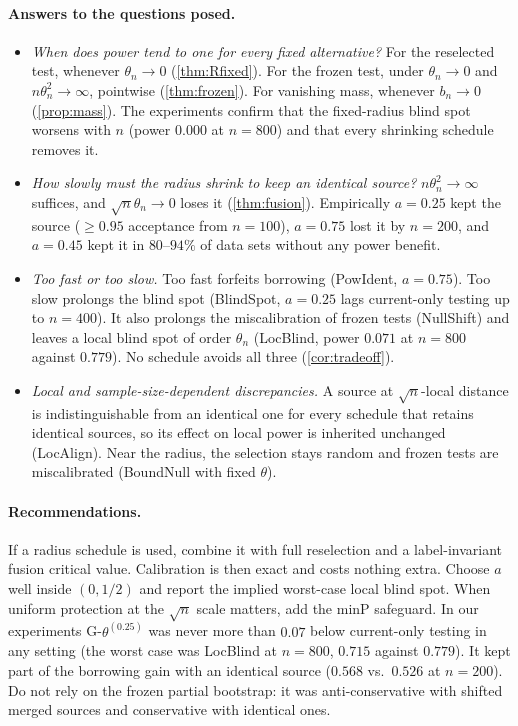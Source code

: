 \paragraph{Answers to the questions posed.}
\begin{itemize}[leftmargin=1.4em,itemsep=1pt]
\item \emph{When does power tend to one for every fixed alternative?} For the reselected test, whenever $\theta_n\to0$ (\cref{thm:Rfixed}). For the frozen test, under $\theta_n\to0$ and $n\theta_n^2\to\infty$, pointwise (\cref{thm:frozen}). For vanishing mass, whenever $b_n\to0$ (\cref{prop:mass}). The experiments confirm that the fixed-radius blind spot worsens with $n$ (power $0.000$ at $n=800$) and that every shrinking schedule removes it.
\item \emph{How slowly must the radius shrink to keep an identical source?} $n\theta_n^2\to\infty$ suffices, and $\sqrt n\theta_n\to0$ loses it (\cref{thm:fusion}). Empirically $a=0.25$ kept the source ($\ge0.95$ acceptance from $n=100$), $a=0.75$ lost it by $n=200$, and $a=0.45$ kept it in $80$--$94\%$ of data sets without any power benefit.
\item \emph{Too fast or too slow.} Too fast forfeits borrowing (PowIdent, $a=0.75$). Too slow prolongs the blind spot (BlindSpot, $a=0.25$ lags current-only testing up to $n=400$). It also prolongs the miscalibration of frozen tests (NullShift) and leaves a local blind spot of order $\theta_n$ (LocBlind, power $0.071$ at $n=800$ against $0.779$). No schedule avoids all three (\cref{cor:tradeoff}).
\item \emph{Local and sample-size-dependent discrepancies.} A source at $\sqrt n$-local distance is indistinguishable from an identical one for every schedule that retains identical sources, so its effect on local power is inherited unchanged (LocAlign). Near the radius, the selection stays random and frozen tests are miscalibrated (BoundNull with fixed $\theta$).
\end{itemize}

\paragraph{Recommendations.} If a radius schedule is used, combine it with full reselection and a label-invariant fusion critical value. Calibration is then exact and costs nothing extra. Choose $a$ well inside $(0,1/2)$ and report the implied worst-case local blind spot. When uniform protection at the $\sqrt n$ scale matters, add the minP safeguard. In our experiments G-$\theta^{(0.25)}$ was never more than $0.07$ below current-only testing in any setting (the worst case was LocBlind at $n=800$, $0.715$ against $0.779$). It kept part of the borrowing gain with an identical source ($0.568$ vs.\ $0.526$ at $n=200$). Do not rely on the frozen partial bootstrap: it was anti-conservative with shifted merged sources and conservative with identical ones.

